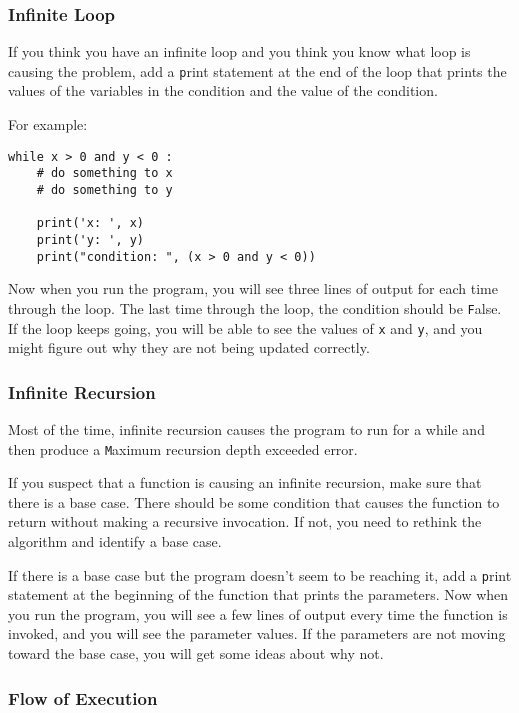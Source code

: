 \documentclass[
DIV=11,
fontsize=13,
twoside,
headinclude=false,
titlepage=firstiscover,
abstract=true,
headsepline=true,
footsepline=true,
chapterprefix=true, %
headings=big,
bibliography=totoc,%
captions=tableheading
]{scrbook}
\theoremstyle{definition}
\begin{document}
\subsubsection{Infinite Loop}

If you think you have an infinite loop and you think you know
what loop is causing the problem, add a {\texttt print} statement at
the end of the loop that prints the values of the variables in
the condition and the value of the condition.

For example:

\begin{lstlisting}
while x > 0 and y < 0 :
    # do something to x
    # do something to y

    print('x: ', x)
    print('y: ', y)
    print("condition: ", (x > 0 and y < 0))
\end{lstlisting}
%
Now when you run the program, you will see three lines of output
for each time through the loop.  The last time through the
loop, the condition should be {\texttt False}.  If the loop keeps
going, you will be able to see the values of {\texttt x} and {\texttt y},
and you might figure out why they are not being updated correctly.


\subsubsection{Infinite Recursion}

Most of the time, infinite recursion causes the program to run
for a while and then produce a {\texttt Maximum recursion depth exceeded}
error.

If you suspect that a function is causing an infinite
recursion, make sure that there is a base case.
There should be some condition that causes the
function to return without making a recursive invocation.
If not, you need to rethink the algorithm and identify a base
case.

If there is a base case but the program doesn't seem to be reaching
it, add a {\texttt print} statement at the beginning of the function
that prints the parameters.  Now when you run the program, you will see
a few lines of output every time the function is invoked,
and you will see the parameter values.  If the parameters are not moving
toward the base case, you will get some ideas about why not.


\subsubsection{Flow of Execution}
\end{document}
